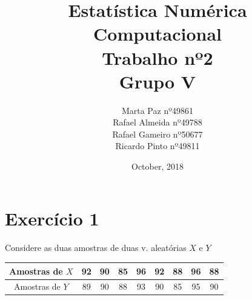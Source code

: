 \documentclass{article}
\title{Estatística Numérica Computacional\\Trabalho nº2\\Grupo V}
\author{Marta Paz nº49861\\
		Rafael Almeida nº49788\\
		Rafael Gameiro nº50677\\
		Ricardo Pinto nº49811\\
}
\date{October, 2018}
\begin{document}
	\maketitle
	\newpage
	
	\section*{Exercício 1}
		\paragraph{}
			Considere as duas amostras de duas v. aleatórias $X$ e $Y$
			
			\begin{table}[!h]
				\begin{tabular}{|c|cccccccc|}
					\hline
 					Amostras de $X$ & 92 & 90 & 85 & 96 & 92 & 88 & 96 & 88 \\
 					\hline
 					Amostras de $Y$ & 89 & 90 & 88 & 93 & 90 & 85 & 95 & 90 \\
 					\hline
				\end{tabular}
			\end{table}
			
\end{document}
